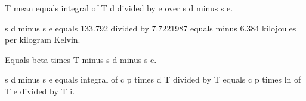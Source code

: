 T mean equals integral of T d divided by e over s d minus s e.  

s d minus s e equals 133.792 divided by 7.7221987 equals minus 6.384 kilojoules per kilogram Kelvin.  

Equals beta times T minus s d minus s e.  

s d minus s e equals integral of c p times d T divided by T equals c p times ln of T e divided by T i.